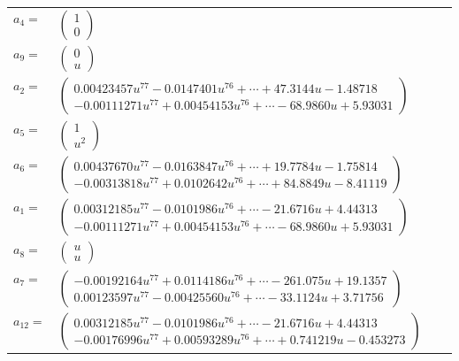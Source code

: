 \documentclass[1p]{elsarticle_modified}
\theoremstyle{definition}
\begin{document}
\begin{tabular}{m{7pt} m{180pt} m{7pt} m{180pt} }
\flushright $a_{4}=$&$\begin{pmatrix}1\\0\end{pmatrix}$ \\
\flushright $a_{9}=$&$\begin{pmatrix}0\\u\end{pmatrix}$ \\
\flushright $a_{2}=$&$\begin{pmatrix}0.00423457 u^{77}-0.0147401 u^{76}+\cdots+47.3144 u-1.48718\\-0.00111271 u^{77}+0.00454153 u^{76}+\cdots-68.9860 u+5.93031\end{pmatrix}$ \\
\flushright $a_{5}=$&$\begin{pmatrix}1\\u^2\end{pmatrix}$ \\
\flushright $a_{6}=$&$\begin{pmatrix}0.00437670 u^{77}-0.0163847 u^{76}+\cdots+19.7784 u-1.75814\\-0.00313818 u^{77}+0.0102642 u^{76}+\cdots+84.8849 u-8.41119\end{pmatrix}$ \\
\flushright $a_{1}=$&$\begin{pmatrix}0.00312185 u^{77}-0.0101986 u^{76}+\cdots-21.6716 u+4.44313\\-0.00111271 u^{77}+0.00454153 u^{76}+\cdots-68.9860 u+5.93031\end{pmatrix}$ \\
\flushright $a_{8}=$&$\begin{pmatrix}u\\u\end{pmatrix}$ \\
\flushright $a_{7}=$&$\begin{pmatrix}-0.00192164 u^{77}+0.0114186 u^{76}+\cdots-261.075 u+19.1357\\0.00123597 u^{77}-0.00425560 u^{76}+\cdots-33.1124 u+3.71756\end{pmatrix}$ \\
\flushright $a_{12}=$&$\begin{pmatrix}0.00312185 u^{77}-0.0101986 u^{76}+\cdots-21.6716 u+4.44313\\-0.00176996 u^{77}+0.00593289 u^{76}+\cdots+0.741219 u-0.453273\end{pmatrix}$ \\

\end{tabular}
\end{document}
